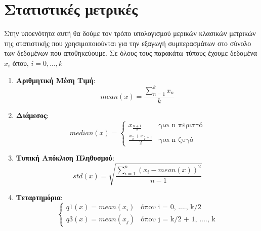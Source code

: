 \break

\section{Στατιστικές μετρικές}
\label{section:statistics}

Στην υποενότητα αυτή θα δούμε τον τρόπο υπολογισμού μερικών κλασικών μετρικών της στατιστικής
που χρησιμοποιούνται για την εξαγωγή συμπερασμάτων στο σύνολο των δεδομένων που αποθηκεύουμε.
Σε όλους τους παρακάτω τύπους έχουμε δεδομένα $x_i$ όπου, $i = 0, ..., k$

\begin{enumerate}
	\item \textbf{Αριθμητική Μέση Τιμή}:
	      \begin{equation}
		      mean(x) = \frac{\sum_{n = 1}^{k} x_n}{k}
	      \end{equation}
	\item \textbf{Διάμεσος}:
	      \begin{equation}
		      median(x) =
		      \begin{cases}
			      x_{\frac{n + 1}{2}}                             & \text{για n περιττό}
			      \\[10pt]
			      \frac{x_{\frac{n}{2}} + x_{\frac{n}{2} + 1}}{2} & \text{για n ζυγό}
		      \end{cases}
	      \end{equation}
	\item \textbf{Τυπική Απόκλιση Πληθυσμού}:
	      \begin{equation}
		      std(x) = \sqrt{\frac{\sum_{i = 1}^{n} (x_i - mean(x))^2}{n - 1}}
	      \end{equation}
	\item \textbf{Τεταρτημόρια}:
	      \begin{equation}
				\begin{cases}
					q1(x) = mean(x_i) & \text{όπου i = 0, ...., k/2} \\
					q3(x) = mean(x_j) & \text{όπου j = k/2 + 1, ...., k}
				\end{cases}
	      \end{equation}
\end{enumerate}

\break